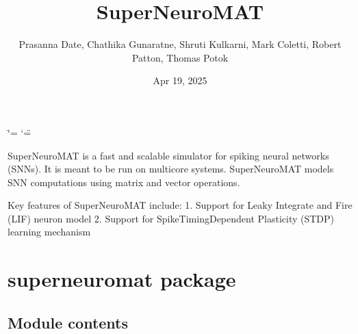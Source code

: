 \documentclass[letterpaper,10pt,english]{sphinxmanual}
\title{SuperNeuroMAT}
\date{Apr 19, 2025}
\author{Prasanna Date, Chathika Gunaratne, Shruti Kulkarni, Mark Coletti, Robert Patton, Thomas Potok}
\begin{document}
\ifdefined\shorthandoff
  \ifnum\catcode`\=\string=\active\shorthandoff{=}\fi
  \ifnum\catcode`\"=\active{}\fi
\fi

\pagestyle{empty}
\sphinxmaketitle
\pagestyle{plain}
\sphinxtableofcontents
\pagestyle{normal}
\label{\detokenize{index::doc}}


\sphinxAtStartPar
SuperNeuroMAT is a fast and scalable simulator for spiking neural networks (SNNs). It is meant to be run on multi\sphinxhyphen{}core systems. SuperNeuroMAT models SNN computations using matrix and vector operations.

\sphinxAtStartPar
Key features of SuperNeuroMAT include:
1. Support for Leaky Integrate and Fire (LIF) neuron model
2. Support for Spike\sphinxhyphen{}Timing\sphinxhyphen{}Dependent Plasticity (STDP) learning mechanism


\chapter{superneuromat package}
\label{\detokenize{index:superneuromat-package}}

\section{Module contents}
\label{\detokenize{index:module-superneuromat}}\label{\detokenize{index:module-contents}}
\end{document}
